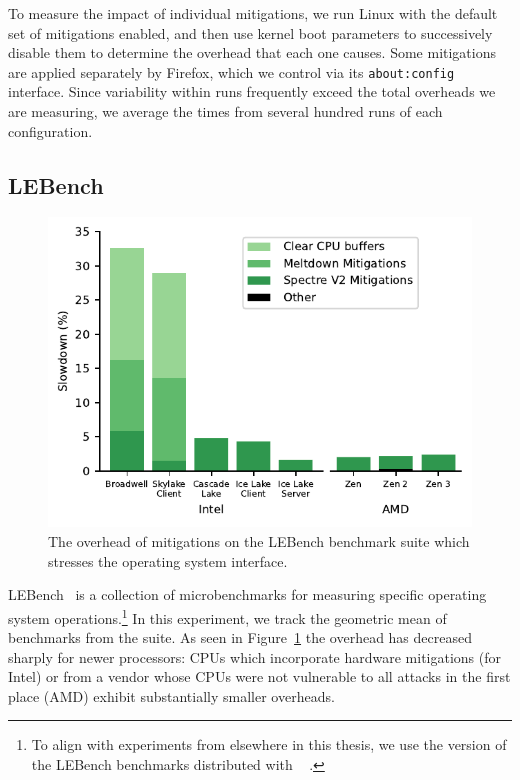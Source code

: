 To measure the impact of individual mitigations, we run  Linux with the default set of mitigations enabled, and then use kernel boot parameters to successively disable them to determine the overhead that each one causes.
Some mitigations are applied separately by Firefox, which we control via its \texttt{about:config} interface.
Since variability within runs frequently exceed the total overheads we are measuring, we average the times from several hundred runs of each configuration.


\subsection{LEBench}
\label{sec:benchmarks:lebench}

\begin{figure}[t]
    \includegraphics[width=\columnwidth]{plots/lebench.pdf}
    \caption{The overhead of mitigations on the LEBench benchmark suite which stresses the operating system interface.}
    \label{fig:lebench}
\end{figure}


LEBench~\cite{ren:lebench} is a collection of microbenchmarks for measuring specific operating system operations.\footnote{To align with experiments from elsewhere in this thesis, we use the version of the LEBench benchmarks distributed with \sys~\cite{behrens:ward} .}
In this experiment, we track the geometric mean of benchmarks from the suite.
As seen in Figure~\ref{fig:lebench} the overhead has decreased sharply for newer processors:
CPUs which incorporate hardware mitigations (for Intel) or from a vendor whose CPUs were not vulnerable to all attacks in the first place (AMD) exhibit substantially smaller overheads.

